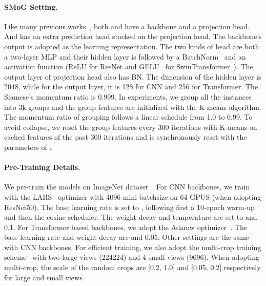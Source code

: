 \documentclass[runningheads]{style/llncs}
\begin{document}
\paragraph{SMoG Setting.}  
Like many previous works~\cite{byol,mocov3,moby}, both  and  have a backbone and a projection head. And  has an extra prediction head stacked on the projection head. The backbone's output is adopted as the learning representation. The two kinds of head are both a two-layer MLP and their hidden layer is followed by a BatchNorm~\cite{bn} and an activation function (ReLU for ResNet and GELU~\cite{gelu} for SwinTransformer~\cite{SwinT}). The output layer of projection head also has BN. The dimension of the hidden layer is 2048, while for the output layer, it is 128 for CNN and 256 for Transformer. The Siamese's momentum ratio  is 0.999. In experiments, we group all the instances into 3k groups and the group features  are initialized with the K-means algorithm. The momentum ratio  of grouping follows a linear schedule from 1.0 to 0.99. To avoid collapse, we reset the group features every 300 iterations with K-means on cached features of the past 300 iterations and  is synchronously reset with the parameters of .

\paragraph{Pre-Training Details.}
We pre-train the models on ImageNet dataset~\cite{imagenet}. For CNN backbones, we train with the LARS~\cite{LARS} optimizer with 4096 mini-batchsize on 64 GPUS (when adopting ResNet50). The base learning rate is set to , following first a 10-epoch warm-up and then the cosine scheduler. The weight decay and temperature  are set to  and 0.1. For Transformer based backbones, we adopt the Adamw optimizer~\cite{loshchilov2018fixing}. The base learning rate and weight decay are  and 0.05. Other settings are the same with CNN backbones. For efficient training, we also adopt the multi-crop training scheme~\cite{swav,dino} with two large views (224224) and 4 small views (9696). When adopting multi-crop, the scale of the random crops are [0.2, 1.0] and [0.05, 0.2] respectively for large and small views.
\end{document}
